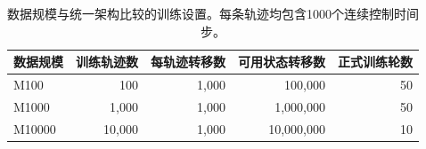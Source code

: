 
\begin{table}[H]
\centering
\caption{数据规模与统一架构比较的训练设置。每条轨迹均包含1000个连续控制时间步。}
\label{tab:data_scales}
\small
\begin{tabular}{lrrrr}
\toprule
数据规模 & 训练轨迹数 & 每轨迹转移数 & 可用状态转移数 & 正式训练轮数 \\
\midrule
M100 & 100 & 1,000 & 100,000 & 50 \\
M1000 & 1,000 & 1,000 & 1,000,000 & 50 \\
M10000 & 10,000 & 1,000 & 10,000,000 & 10 \\
\bottomrule
\end{tabular}
\end{table}
